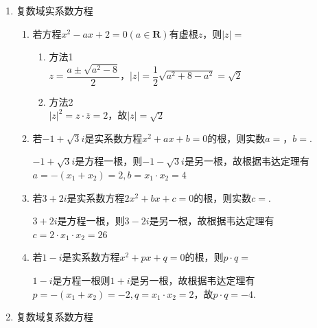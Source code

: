 \begin{enumerate}
\begin{enumerate}
\begin{jieda}
        因此$\dfrac{z_1}{z_2} = \dfrac{r_1}{r_2}\left[cos\left(-\dfrac{\pi}{2}\right) + i sin\left(-\dfrac{\pi}{2}\right)\right] = \dfrac{r_1}{r_2}i$或$\dfrac{z_1}{z_2} = \dfrac{r_1}{r_2}\left[cos\left(\dfrac{\pi}{2}\right) + i sin\left(\dfrac{\pi}{2}\right)\right] = -\dfrac{r_1}{r_2}i$ \\
        故$\left(\dfrac{z_1}{z_2}\right)^2 = -\left(\dfrac{r_1}{r_2}\right)^2 \in \mathbf{R^-}$
    \end{jieda}
\end{enumerate}
\item 复数域实系数方程
\begin{enumerate}
    \item 若方程$x^2 - ax + 2 = 0 (a \in \mathbf{R})$有虚根$z$，则$|z| = $
    \begin{jieda}
        \begin{enumerate}
            \item 方法1 \\
            $z = \dfrac{a \pm \sqrt{a^2 - 8}}{2}$，$|z| = \dfrac{1}{2}\sqrt{a^2 + 8 - a^2} = \sqrt{2}$
            \item 方法2 \\
            $|z|^2 = z \cdot \overline{z} = 2$，故$|z| = \sqrt{2}$
        \end{enumerate}
    \end{jieda}
    \item 若$-1+\sqrt{3}i$是实系数方程$x^2+ax+b=0$的根，则实数$a = $，$b = $.
    \begin{jieda}
        $-1+\sqrt{3}i$是方程一根，则$-1-\sqrt{3}i$是另一根，故根据韦达定理有$a = -(x_1 + x_2) = 2, b = x_1 \cdot x_2 = 4$
    \end{jieda}
    \item 若$3+2i$是实系数方程$2x^2+bx+c=0$的根，则实数$c = $.
    \begin{jieda}
        $3+2i$是方程一根，则$3-2i$是另一根，故根据韦达定理有$c = 2 \cdot x_1 \cdot x_2 = 26$
    \end{jieda}
    \item 若$1-i$是实系数方程$x^2+px+q = 0$的根，则$p\cdot q = $
    \begin{jieda}
        $1-i$是方程一根则$1+i$是另一根，故根据韦达定理有$p = -(x_1 + x_2) = -2, q = x_1 \cdot x_2 = 2$，故$p\cdot q = -4$.
    \end{jieda}
\end{enumerate}
\item 复数域复系数方程
\begin{enumerate}

\end{enumerate}
\end{enumerate}
